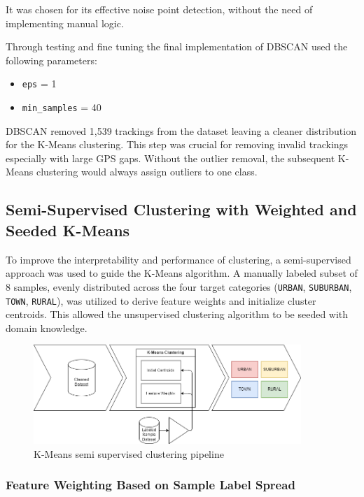 \documentclass[a4paper,12pt,twoside]{scrreprt}
\begin{document}
It was chosen for its effective noise point detection, without the need of
implementing manual logic.

Through testing and fine tuning the final implementation of DBSCAN used the
following parameters:
\begin{itemize}
  \item \texttt{eps} = 1
  \item \texttt{min\_samples} = 40
\end{itemize}

DBSCAN removed 1,539 trackings from the dataset leaving a cleaner distribution
for the K-Means clustering.
This step was crucial for removing invalid trackings especially with large GPS
gaps. Without the outlier removal, the subsequent K-Means clustering would
always assign
outliers to one class.

\subsection{Semi-Supervised Clustering with Weighted and Seeded K-Means}

To improve the interpretability and performance of clustering, a
semi-supervised approach was used to guide the K-Means algorithm. A manually
labeled subset of 8 samples, evenly distributed across the four target
categories (\texttt{URBAN}, \texttt{SUBURBAN}, \texttt{TOWN}, \texttt{RURAL}),
was utilized to derive feature weights and initialize cluster centroids. This
allowed the unsupervised clustering algorithm to be seeded with domain
knowledge.

\begin{figure}[htbp]
  \centering

  \includegraphics[width=0.9\textwidth]{Diagrams/drawio/implementation/clustering_pipeline.png}
  \caption{K-Means semi supervised clustering pipeline}
  \label{fig:kmeans-clustering-pipline}
\end{figure}
\FloatBarrier

\subsubsection{Feature Weighting Based on Sample Label Spread}
\end{document}
